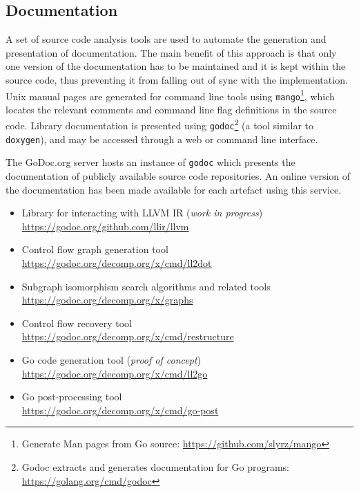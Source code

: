 
\subsection{Documentation}

A set of source code analysis tools are used to automate the generation and presentation of documentation. The main benefit of this approach is that only one version of the documentation has to be maintained and it is kept within the source code, thus preventing it from falling out of sync with the implementation. Unix manual pages are generated for command line tools using \texttt{mango}\footnote{Generate Man pages from Go source: \url{https://github.com/slyrz/mango}}, which locates the relevant comments and command line flag definitions in the source code. Library documentation is presented using \texttt{godoc}\footnote{Godoc extracts and generates documentation for Go programs: \url{https://golang.org/cmd/godoc}} (a tool similar to \texttt{doxygen}), and may be accessed through a web or command line interface.

The GoDoc.org server hosts an instance of \texttt{godoc} which presents the documentation of publicly available source code repositories. An online version of the documentation has been made available for each artefact using this service.

\begin{itemize}
	\item Library for interacting with LLVM IR (\textit{work in progress}) \\ \url{https://godoc.org/github.com/llir/llvm}
	\item Control flow graph generation tool \\ \url{https://godoc.org/decomp.org/x/cmd/ll2dot}
	\item Subgraph isomorphism search algorithms and related tools \\ \url{https://godoc.org/decomp.org/x/graphs}
	\item Control flow recovery tool \\ \url{https://godoc.org/decomp.org/x/cmd/restructure}
	\item Go code generation tool (\textit{proof of concept}) \\ \url{https://godoc.org/decomp.org/x/cmd/ll2go}
	\item Go post-processing tool \\ \url{https://godoc.org/decomp.org/x/cmd/go-post}
\end{itemize}
